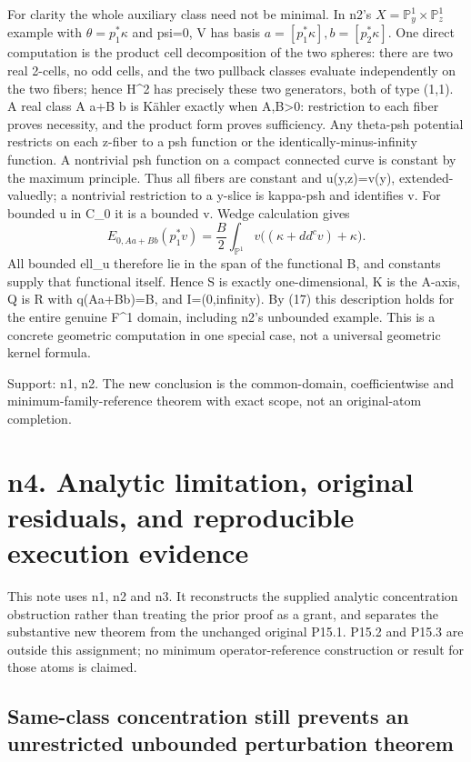 \documentclass[
]{article}
\begin{document}
For clarity the whole auxiliary class need not be minimal. In n2's
\(X=\mathbb P^1_y\times\mathbb P^1_z\) example with
\(\theta=p_1^*\kappa\) and psi=0, V has basis
\(a=[p_1^*\kappa],b=[p_2^*\kappa]\). One direct computation is the
product cell decomposition of the two spheres: there are two real
2-cells, no odd cells, and the two pullback classes evaluate
independently on the two fibers; hence H\^{}2 has precisely these two
generators, both of type (1,1). A real class A a+B b is Kähler exactly
when A,B\textgreater0: restriction to each fiber proves necessity, and
the product form proves sufficiency. Any theta-psh potential restricts
on each z-fiber to a psh function or the identically-minus-infinity
function. A nontrivial psh function on a compact connected curve is
constant by the maximum principle. Thus all fibers are constant and
u(y,z)=v(y), extended-valuedly; a nontrivial restriction to a y-slice is
kappa-psh and identifies v. For bounded u in C\_0 it is a bounded v.
Wedge calculation gives \[
E_{0,Aa+Bb}(p_1^*v)=\frac B2\int_{\mathbb P^1}v\big((\kappa+dd^cv)+\kappa\big).
\] All bounded ell\_u therefore lie in the span of the functional B, and
constants supply that functional itself. Hence S is exactly
one-dimensional, K is the A-axis, Q is R with q(Aa+Bb)=B, and
I=(0,infinity). By (17) this description holds for the entire genuine
F\^{}1 domain, including n2's unbounded example. This is a concrete
geometric computation in one special case, not a universal geometric
kernel formula.

Support: n1, n2. The new conclusion is the common-domain,
coefficientwise and minimum-family-reference theorem with exact scope,
not an original-atom completion.

\section{n4. Analytic limitation, original residuals, and reproducible
execution
evidence}\label{n4.-analytic-limitation-original-residuals-and-reproducible-execution-evidence}

This note uses n1, n2 and n3. It reconstructs the supplied analytic
concentration obstruction rather than treating the prior proof as a
grant, and separates the substantive new theorem from the unchanged
original P15.1. P15.2 and P15.3 are outside this assignment; no minimum
operator-reference construction or result for those atoms is claimed.

\subsection{Same-class concentration still prevents an unrestricted
unbounded perturbation
theorem}\label{same-class-concentration-still-prevents-an-unrestricted-unbounded-perturbation-theorem}
\end{document}
